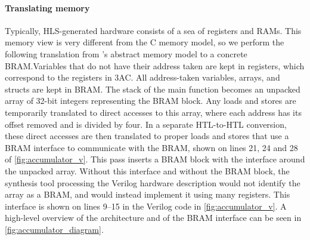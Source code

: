 \begin{figure*}
\caption{The FSMD for the example shown in \cref{fig:accumulator_c_rtl}, split
  into a data-path and control logic for the next state calculation.  The Update
  block takes the current state, current values of all registers and at most one
  value stored in the \gls{BRAM}, and calculates a new value that can either be
  stored back in the \gls{BRAM} or in a
  register.}\label{fig:accumulator_diagram}
\end{figure*}

\paragraph{Translating memory}
Typically, HLS-generated hardware consists of a sea of registers and RAMs.  This
memory view is very different from the C memory model, so we perform the
following translation from \compcert{}'s abstract memory model to a concrete
\gls{BRAM}.\@ Variables that do not have their address taken are kept in
registers, which correspond to the registers in 3AC.  All address-taken
variables, arrays, and structs are kept in \gls{BRAM}.  The stack of the main
function becomes an unpacked array of 32-bit integers representing the
\gls{BRAM} block.  Any loads and stores are temporarily translated to direct
accesses to this array, where each address has its offset removed and is divided
by four.  In a separate HTL-to-HTL conversion, these direct accesses are then
translated to proper loads and stores that use a \gls{BRAM} interface to
communicate with the \gls{BRAM}, shown on lines 21, 24 and 28 of
\cref{fig:accumulator_v}.  This pass inserts a \gls{BRAM} block with the
interface around the unpacked array.  Without this interface and without the
\gls{BRAM} block, the synthesis tool processing the Verilog hardware description
would not identify the array as a \gls{BRAM}, and would instead implement it
using many registers.  This interface is shown on lines 9--15 in the Verilog
code in \cref{fig:accumulator_v}.  A high-level overview of the architecture and
of the \gls{BRAM} interface can be seen in \cref{fig:accumulator_diagram}.

